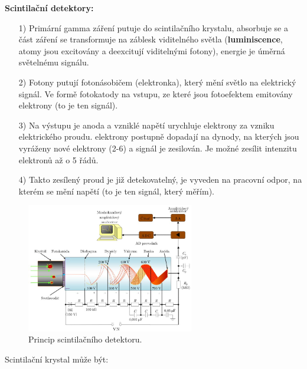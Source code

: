 \textbf{Scintilační detektory:}

\begin{itemize}
    \item[1)] Primární gamma záření putuje do scintilačního krystalu, absorbuje se a část záření se transformuje na záblesk viditelného světla (\textbf{luminiscence}, atomy jsou excitovány a deexcitují viditelnými fotony), energie je úměrná světelnému signálu.
    \item[2)] Fotony putují fotonásobičem (elektronka), který mění světlo na elektrický signál. Ve formě fotokatody na vstupu, ze které jsou fotoefektem emitovány elektrony (to je ten signál).
    \item[3)] Na výstupu je anoda a vzniklé napětí urychluje elektrony za vzniku elektrického proudu. elektrony postupně dopadají na dynody, na kterých jsou vyráženy nové elektrony (2-6) a signál je zesilován. Je možné zesílit intenzitu elektronů až o 5 řádů.
    \item[4)] Takto zesílený proud je již detekovatelný, je vyveden na pracovní odpor, na kterém se mění napětí (to je ten signál, který měřím). 
\end{itemize}

\begin{figure}[H]
    \centering
    \includegraphics[width=0.65\textwidth]{img/scintilak.JPG}
    \caption{Princip scintilačního detektoru.}
\end{figure}

Scintilační krystal může být:

